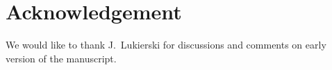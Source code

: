 \documentclass [prd,twocolumn,nofootinbib,showpacs]  {revtex4}
\begin{document}
\section*{Acknowledgement}

We would like to thank J.~Lukierski for discussions and comments on early version of the manuscript.
\end{document}
